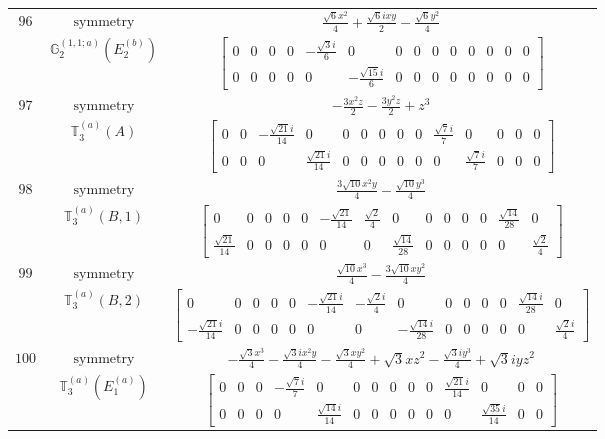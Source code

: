 \documentclass[fleqn,8pt,landscape]{jsarticle}
\begin{document}
\begin{longtable}{ccc}
$ 96 $ & $ \text{symmetry} $ & $ \frac{\sqrt{6} x^{2}}{4} + \frac{\sqrt{6} i x y}{2} - \frac{\sqrt{6} y^{2}}{4} $ \\
$  $ & $ \mathbb{G}_{2}^{(1,1;a)}(E_{2}^{(b)}) $ & $ \begin{bmatrix} 0 & 0 & 0 & 0 & - \frac{\sqrt{3} i}{6} & 0 & 0 & 0 & 0 & 0 & 0 & 0 & 0 & 0 \\ 0 & 0 & 0 & 0 & 0 & - \frac{\sqrt{15} i}{6} & 0 & 0 & 0 & 0 & 0 & 0 & 0 & 0 \end{bmatrix} $ \\ \hline
$ 97 $ & $ \text{symmetry} $ & $ - \frac{3 x^{2} z}{2} - \frac{3 y^{2} z}{2} + z^{3} $ \\
$  $ & $ \mathbb{T}_{3}^{(a)}(A) $ & $ \begin{bmatrix} 0 & 0 & - \frac{\sqrt{21} i}{14} & 0 & 0 & 0 & 0 & 0 & 0 & \frac{\sqrt{7} i}{7} & 0 & 0 & 0 & 0 \\ 0 & 0 & 0 & \frac{\sqrt{21} i}{14} & 0 & 0 & 0 & 0 & 0 & 0 & \frac{\sqrt{7} i}{7} & 0 & 0 & 0 \end{bmatrix} $ \\ \hline
$ 98 $ & $ \text{symmetry} $ & $ \frac{3 \sqrt{10} x^{2} y}{4} - \frac{\sqrt{10} y^{3}}{4} $ \\
$  $ & $ \mathbb{T}_{3}^{(a)}(B,1) $ & $ \begin{bmatrix} 0 & 0 & 0 & 0 & 0 & - \frac{\sqrt{21}}{14} & \frac{\sqrt{2}}{4} & 0 & 0 & 0 & 0 & 0 & \frac{\sqrt{14}}{28} & 0 \\ \frac{\sqrt{21}}{14} & 0 & 0 & 0 & 0 & 0 & 0 & \frac{\sqrt{14}}{28} & 0 & 0 & 0 & 0 & 0 & \frac{\sqrt{2}}{4} \end{bmatrix} $ \\ \hline
$ 99 $ & $ \text{symmetry} $ & $ \frac{\sqrt{10} x^{3}}{4} - \frac{3 \sqrt{10} x y^{2}}{4} $ \\
$  $ & $ \mathbb{T}_{3}^{(a)}(B,2) $ & $ \begin{bmatrix} 0 & 0 & 0 & 0 & 0 & - \frac{\sqrt{21} i}{14} & - \frac{\sqrt{2} i}{4} & 0 & 0 & 0 & 0 & 0 & \frac{\sqrt{14} i}{28} & 0 \\ - \frac{\sqrt{21} i}{14} & 0 & 0 & 0 & 0 & 0 & 0 & - \frac{\sqrt{14} i}{28} & 0 & 0 & 0 & 0 & 0 & \frac{\sqrt{2} i}{4} \end{bmatrix} $ \\ \hline
$ 100 $ & $ \text{symmetry} $ & $ - \frac{\sqrt{3} x^{3}}{4} - \frac{\sqrt{3} i x^{2} y}{4} - \frac{\sqrt{3} x y^{2}}{4} + \sqrt{3} x z^{2} - \frac{\sqrt{3} i y^{3}}{4} + \sqrt{3} i y z^{2} $ \\
$  $ & $ \mathbb{T}_{3}^{(a)}(E_{1}^{(a)}) $ & $ \begin{bmatrix} 0 & 0 & 0 & - \frac{\sqrt{7} i}{7} & 0 & 0 & 0 & 0 & 0 & 0 & \frac{\sqrt{21} i}{14} & 0 & 0 & 0 \\ 0 & 0 & 0 & 0 & \frac{\sqrt{14} i}{14} & 0 & 0 & 0 & 0 & 0 & 0 & \frac{\sqrt{35} i}{14} & 0 & 0 \end{bmatrix} $ \\ \hline

\end{longtable}
\end{document}
